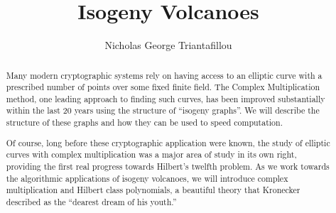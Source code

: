 \documentclass{amsart}
\theoremstyle{definition}
\theoremstyle{remark}
\numberwithin{equation}{section}
\begin{document}

\title{Isogeny Volcanoes}


\author{Nicholas George Triantafillou}
\address{Department of Mathematics, University of Cambridge, 
Cambridge, Cambridgeshire, UK CB3 0WB}





\begin{abstract}
Many modern cryptographic systems rely on having access to an elliptic curve with a prescribed number of points over some fixed finite field. The Complex Multiplication method, one leading approach to finding such curves, has been improved substantially within the last 20 years using the structure of ``isogeny graphs''. We will describe the structure of these graphs and how they can be used to speed computation.

Of course, long before these cryptographic application were known, the study of elliptic curves with complex multiplication was a major area of study in its own right, providing the first real progress towards Hilbert's twelfth problem. As we work towards the algorithmic applications of isogeny volcanoes, we will introduce complex multiplication and Hilbert class polynomials, a beautiful theory that Kronecker described as the ``dearest dream of his youth.''

\end{abstract}


 \maketitle
\end{document}

